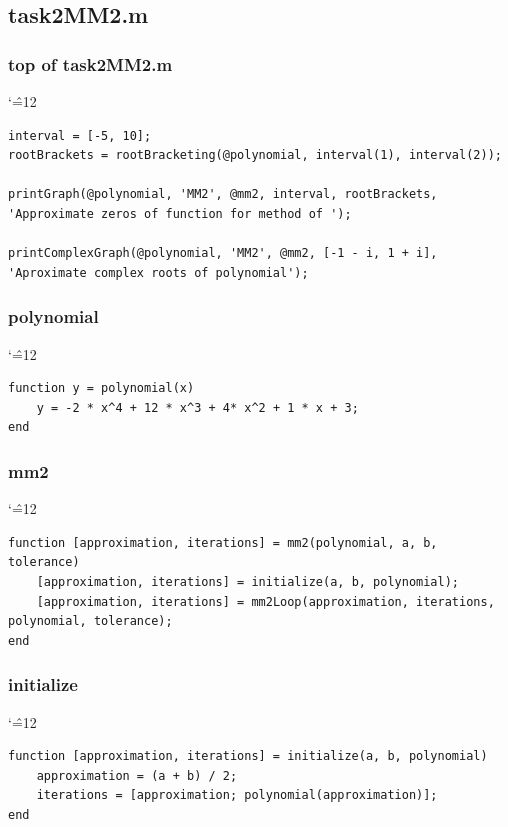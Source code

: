 \documentclass[12pt]{report}
\newenvironment{simplechar}{%
   \catcode`\^=12
}{}
\begin{document}
\newpage
\subsection{task2MM2.m}


\subsubsection{top of task2MM2.m}
\begin{simplechar}
\begin{lstlisting}
interval = [-5, 10];
rootBrackets = rootBracketing(@polynomial, interval(1), interval(2));

printGraph(@polynomial, 'MM2', @mm2, interval, rootBrackets, 'Approximate zeros of function for method of ');

printComplexGraph(@polynomial, 'MM2', @mm2, [-1 - i, 1 + i], 'Aproximate complex roots of polynomial');
\end{lstlisting}
\end{simplechar}

\subsubsection{polynomial}
\begin{simplechar}
\begin{lstlisting}
function y = polynomial(x)
    y = -2 * x^4 + 12 * x^3 + 4* x^2 + 1 * x + 3;
end

\end{lstlisting}
\end{simplechar}

\subsubsection{mm2}
\begin{simplechar}
\begin{lstlisting}
function [approximation, iterations] = mm2(polynomial, a, b, tolerance)
    [approximation, iterations] = initialize(a, b, polynomial);
    [approximation, iterations] = mm2Loop(approximation, iterations, polynomial, tolerance);
end
\end{lstlisting}
\end{simplechar}

\subsubsection{initialize}
\begin{simplechar}
\begin{lstlisting}
function [approximation, iterations] = initialize(a, b, polynomial)
    approximation = (a + b) / 2;
    iterations = [approximation; polynomial(approximation)];
end

\end{lstlisting}
\end{simplechar}
\end{document}
